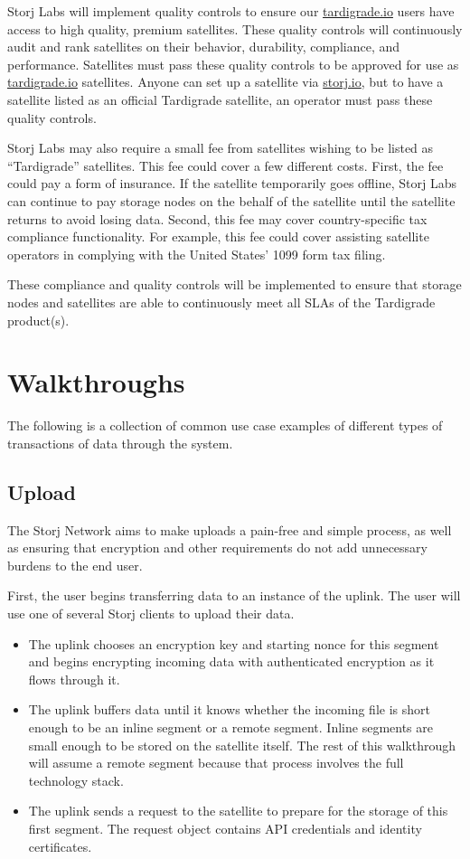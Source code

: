 \documentclass[11pt,fleqn,openany]{book}
\begin{document}
Storj Labs will implement quality controls to ensure our
\url{tardigrade.io} users have access to high quality, premium satellites.
These quality controls will continuously audit and rank satellites on their
behavior, durability, compliance, and performance.
Satellites must pass these quality controls to be approved for use as
\url{tardigrade.io} satellites. Anyone can set up a satellite via
\url{storj.io}, but to have a satellite listed as an official Tardigrade
satellite, an operator must pass these quality controls.

Storj Labs may also require a small fee from satellites wishing to be listed
as ``Tardigrade'' satellites. This fee could cover a few different costs. First,
the fee could pay a form of insurance. If the satellite temporarily goes
offline, Storj Labs can continue to pay storage nodes on the behalf of the
satellite until the satellite returns to avoid losing data. Second, this fee
may cover country-specific tax compliance functionality. For example, this fee
could cover assisting satellite operators in complying with the United States'
1099 form tax filing.

These compliance and quality controls will be implemented to ensure that
storage nodes and satellites are able to continuously meet all SLAs of the
Tardigrade product(s).

\chapter{Walkthroughs}\label{chap:walkthroughs}

The following is a collection of common use case examples of different types of
transactions of data through the system.

\section{Upload}

The Storj Network aims to make uploads a pain-free and simple process, as well
as ensuring that encryption and other requirements do not add unnecessary
burdens to the end user.

First, the user begins transferring data to an instance of the uplink. The
user will use one of several Storj clients to upload their data.

\begin{itemize}
\item The uplink chooses an encryption key and starting nonce for
  this segment and begins encrypting incoming data with authenticated
  encryption as it flows through it.
\item The uplink buffers data until it knows whether the incoming file is
short enough to be an inline segment or a remote segment. Inline segments are
small enough to be stored on the satellite itself. The rest of this
walkthrough will assume a remote segment because that process involves the
full technology stack.
\item The uplink sends a request to the satellite to prepare for the storage
of this first segment. The request object contains API credentials and identity
certificates.
\end{itemize}
\end{document}
